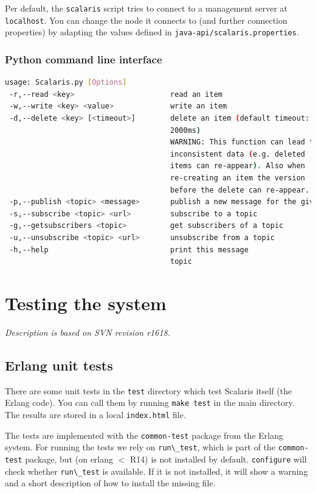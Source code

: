 \documentclass[a4paper]{scrreprt}
\newcommand{\code}[1]{\lstinline[basicstyle=\ttfamily]!#1!}
\newcommand{\svnrev}[1]
{\hfill\emph{Description is based on SVN revision #1.}\medskip}
\begin{document}
Per default, the \code{scalaris} script tries to connect to a management
server at \code{localhost}. You can change the node it connects to (and
further connection properties) by adapting the values defined in
\code{java-api/scalaris.properties}.

\subsection{Python command line interface}

\begin{lstlisting}[language=sh]
%> ./python-api/Scalaris.py --help
usage: Scalaris.py [Options]
 -r,--read <key>                      read an item
 -w,--write <key> <value>             write an item
 -d,--delete <key> [<timeout>]        delete an item (default timeout:
                                      2000ms)
                                      WARNING: This function can lead to
                                      inconsistent data (e.g. deleted
                                      items can re-appear). Also when
                                      re-creating an item the version
                                      before the delete can re-appear.
 -p,--publish <topic> <message>       publish a new message for the given
 -s,--subscribe <topic> <url>         subscribe to a topic
 -g,--getsubscribers <topic>          get subscribers of a topic
 -u,--unsubscribe <topic> <url>       unsubscribe from a topic
 -h,--help                            print this message
                                      topic
\end{lstlisting}

\chapter{Testing the system}
\svnrev{r1618}

\section{Erlang unit tests}
There are some unit tests in the \code{test} directory which test Scalaris
itself (the Erlang code). You can call them
by running \code{make test} in the main directory. The results are stored
in a local \code{index.html} file. 

The tests are implemented with the \code{common-test} package from the
Erlang system. For running the tests we rely on \code{run\_test},
which is part of the \code{common-test} package, but (on erlang $<$ R14) is not
installed by default. \code{configure} will check whether \code{run\_test} is
available. If it is not installed, it will show a warning and a short
description of how to install the missing file.
\end{document}

